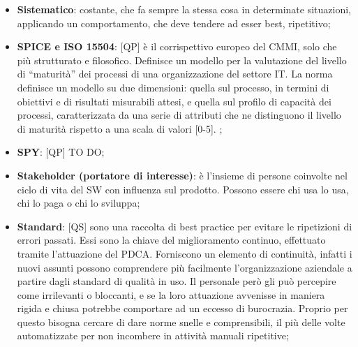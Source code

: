 \begin{itemize}
	\item \textbf{Sistematico}: costante, che fa sempre la stessa cosa in determinate situazioni, applicando un comportamento, che deve tendere ad esser best, ripetitivo;
	\item \textbf{SPICE e ISO 15504}: [QP] è il corrispettivo europeo del CMMI, solo che più strutturato e filosofico. Definisce un modello per la valutazione del livello di ``maturità'' dei processi di una organizzazione del settore IT. \newline
	La norma definisce un modello su due dimensioni: quella sul processo, in termini di obiettivi e di risultati misurabili attesi, e quella sul profilo di capacità dei processi, caratterizzata da una serie di attributi che ne distinguono il livello di maturità rispetto a una scala di valori [0-5]. ;

	\item \textbf{SPY}: [QP] TO DO;

	\item \textbf{Stakeholder (portatore di interesse)}: è l'insieme di persone coinvolte nel ciclo di vita del SW con influenza sul prodotto. \newline
	Possono essere chi usa lo usa, chi lo paga o chi lo sviluppa;
	\item \textbf{Standard}: [QS] sono una raccolta di best practice per evitare le ripetizioni di errori passati. Essi sono la chiave del miglioramento continuo, effettuato tramite l'attuazione del PDCA. \newline
	Forniscono un elemento di continuità, infatti i nuovi assunti possono comprendere più facilmente l'organizzazione aziendale a partire dagli standard di qualità in uso. \newline
	Il personale però gli può percepire come irrilevanti o bloccanti, e se la loro attuazione avvenisse in maniera rigida e chiusa potrebbe comportare ad un eccesso di burocrazia. Proprio per questo bisogna cercare di dare norme snelle e comprensibili, il più delle volte automatizzate per non incombere in attività manuali ripetitive;


\end{itemize}

